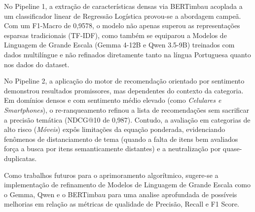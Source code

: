 \documentclass{IEEEtran}
\begin{document}
No Pipeline 1, a extração de características densas via BERTimbau acoplada a um classificador linear de Regressão Logística provou-se a abordagem campeã. Com um F1-Macro de 0,9578, o modelo não apenas superou as representações esparsas tradicionais (TF-IDF), como também se equiparou a Modelos de Linguagem de Grande Escala (Gemma 4-12B e Qwen 3.5-9B) treinados com dados multilíngue e não refinados diretamente tanto na língua Portuguesa quanto nos dados do dataset.

No Pipeline 2, a aplicação do motor de recomendação orientado por sentimento demonstrou resultados promissores, mas dependentes do contexto da categoria. Em domínios densos e com sentimento médio elevado (como \textit{Celulares e Smartphones}), o re-ranqueamento refinou a lista de recomendações sem sacrificar a precisão temática (NDCG@10 de 0,987). Contudo, a avaliação em categorias de alto risco (\textit{Móveis}) expôs limitações da equação ponderada, evidenciando fenômenos de distanciamento de tema (quando a falta de itens bem avaliados força a busca por itens semanticamente distantes) e a neutralização por quase-duplicatas.

Como trabalhos futuros para o aprimoramento algorítmico, sugere-se a implementação de refinamento de Modelos de Linguagem de Grande Escala como o Gemma, Qwen e o BERTimbau para uma analise aprofundada de possíveis melhorias em relação as métricas de qualidade de Precisão, Recall e F1 Score.





\end{document}
